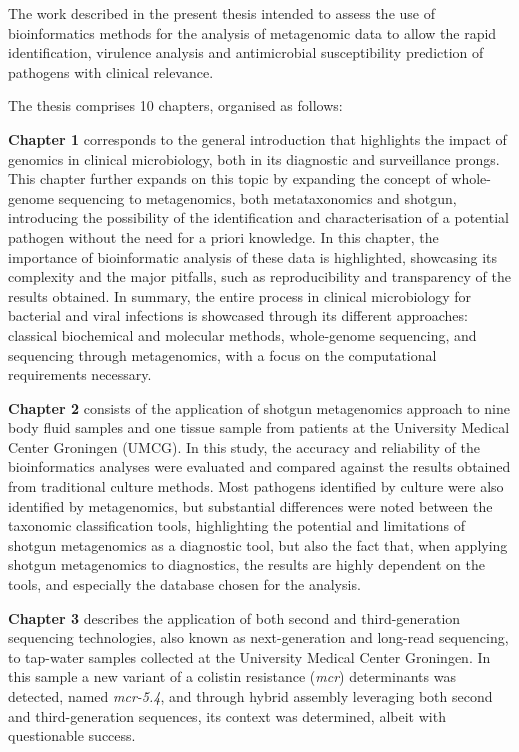 The work described in the present thesis intended to assess the use of bioinformatics methods for the analysis of metagenomic data to allow the rapid identification, virulence analysis and antimicrobial susceptibility prediction of pathogens with clinical relevance. 

The thesis comprises 10 chapters, organised as follows:

\textbf{Chapter 1} corresponds to the general introduction that highlights the impact of genomics in clinical microbiology, both in its diagnostic and surveillance prongs. This chapter further expands on this topic by expanding the concept of whole-genome sequencing to metagenomics, both metataxonomics and shotgun, introducing the possibility of the identification and characterisation of a potential pathogen without the need for a priori knowledge. In this chapter, the importance of bioinformatic analysis of these data is highlighted, showcasing its complexity and the major pitfalls, such as reproducibility and transparency of the results obtained. In summary, the entire process in clinical microbiology for bacterial and viral infections is showcased through its different approaches: classical biochemical and molecular methods, whole-genome sequencing, and sequencing through metagenomics, with a focus on the computational requirements necessary.  

\textbf{Chapter 2} consists of the application of shotgun metagenomics approach to nine body fluid samples and one tissue sample from patients at the University Medical Center Groningen (UMCG). In this study, the accuracy and reliability of the bioinformatics analyses were evaluated and compared against the results obtained from traditional culture methods. Most pathogens identified by culture were also identified by metagenomics, but substantial differences were noted between the taxonomic classification tools, highlighting the potential and limitations of shotgun metagenomics as a diagnostic tool, but also the fact that, when applying shotgun metagenomics to diagnostics, the results are highly dependent on the tools, and especially the database chosen for the analysis.

\textbf{Chapter 3} describes the application of both second and third-generation sequencing technologies, also known as next-generation and long-read sequencing, to tap-water samples collected at the University Medical Center Groningen. In this sample a new variant of a colistin resistance (\textit{mcr}) determinants was detected, named \textit{mcr-5.4}, and through hybrid assembly leveraging both second and third-generation sequences, its context was determined, albeit with questionable success. 

